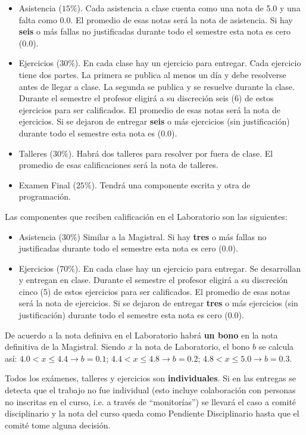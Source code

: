 \documentclass[letterpaper,10pt,onecolumn]{article}
\begin{document}
\begin{itemize}
\item Asistencia ($15\%$). Cada asistencia a clase cuenta como una
  nota de 5.0 y una falta como 0.0. El promedio de esas notas ser\'a
  la nota de asistencia. 
  Si hay {\bf seis} o m\'as fallas no justificadas durante todo el
  semestre esta nota es cero (0.0).
\item Ejercicios ($30\%$). En cada clase hay un ejercicio para
  entregar. Cada ejercicio tiene dos partes. 
  La primera se publica al menos un d\'ia y debe resolverse antes de
  llegar a clase.
  La segunda se publica y se resuelve durante la clase.
  Durante el semestre el profesor eligir\'a a su discreci\'on seis (6)
  de estos ejercicios para ser calificados. 
  El promedio de esas notas ser\'a la nota de ejercicios.
  Si se dejaron de entregar {\bf seis} o m\'as ejercicios (sin
  justificaci\'on) durante todo el semestre esta nota es
  (0.0). 
\item Talleres ($30\%$). Habr\'a dos talleres para resolver por fuera de
  clase. El promedio de esas calificaciones ser\'a la nota de talleres.
\item Examen Final ($25\%$). Tendr\'a una componente escrita y otra de
  programaci\'on. 
\end{itemize}

Las componentes que reciben calificaci\'on en el Laboratorio son las
siguientes:
\begin{itemize}
\item Asistencia ($30\%$) Similar a la Magistral.
  Si hay {\bf tres} o m\'as fallas no justificadas durante todo el
  semestre esta nota es cero (0.0).
\item Ejercicios ($70\%$). En cada clase hay un ejercicio para
  entregar. Se desarrollan y entregan en clase.
  Durante el semestre el profesor eligir\'a a su discreci\'on cinco
  (5) de estos ejercicios para ser calificados.
  El promedio de esas notas ser\'a la nota de ejercicios.
  Si se dejaron de entregar {\bf tres} o m\'as ejercicios (sin
  justificaci\'on) durante todo el semestre esta nota es
  cero (0.0). 
\end{itemize}

De acuerdo a la nota definiva en el Laboratorio habr\'a {\bf un bono} en la
nota definitiva de la Magistral. 
Siendo $x$ la nota de Laboratorio, el bono $b$  se calcula as\'i:
$4.0 < x \leq 4.4 \rightarrow b=0.1$; $4.4< x\leq 4.8\rightarrow b=0.2$; $4.8<x
\leq 5.0\rightarrow b=0.3$.

Todos los ex\'amenes, talleres y ejercicios son
\textbf{individuales}.  
Si en las entregas se detecta que el trabajo no fue
individual (esto incluye colaboraci\'on con personas no inscritas en
el curso, i.e. a trav\'es de ``monitor\'ias'') se llevar\'a el caso a
comit\'e disciplinario y la nota del curso queda como Pendiente
Disciplinario hasta que el comit\'e tome alguna decisi\'on. 
\end{document}
